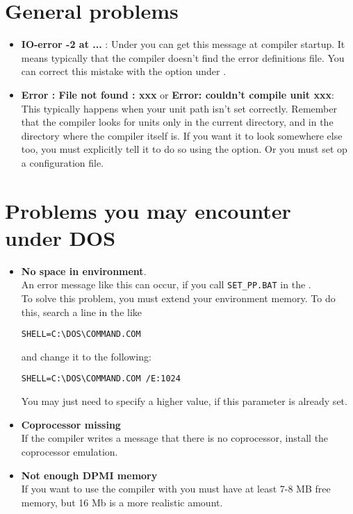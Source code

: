 \section{General problems}
\begin{itemize}
\item \textbf{IO-error -2 at ...} : Under \linux you can get this message at
compiler startup. It means typically that the compiler doesn't find the
error definitions file. You can correct this mistake with the 
option under \linux.
\item \textbf {Error : File not found : xxx} or \textbf{Error: couldn't compile
unit xxx}: This typically happens when
your unit path isn't set correctly. Remember that the compiler looks for
units only in the current directory, and in the directory where the compiler
itself is. If you want it to look somewhere else too, you must explicitly
tell it to do so using the  option. Or you must set op
a configuration file.
\end{itemize}

\section{Problems you may encounter under DOS}
\begin{itemize}
\item \textbf{No space in environment}.\\
An error message like this can occur, if you call
\verb|SET_PP.BAT| in the .\\
To solve this problem, you must extend your environment memory.
To do this, search a line in the  like
\begin{verbatim}
SHELL=C:\DOS\COMMAND.COM
\end{verbatim}
and change it to the following:
\begin{verbatim}
SHELL=C:\DOS\COMMAND.COM /E:1024
\end{verbatim}
You may just need to specify a higher value, if this parameter is already set.
\item \textbf{ Coprocessor missing}\\
If the compiler writes
a message that there is no coprocessor, install
the coprocessor emulation.
\item \textbf{Not enough DPMI memory}\\
If you want to use the compiler with  you must have at least
7-8 MB free  memory, but 16 Mb is a more realistic amount.
\end{itemize}




